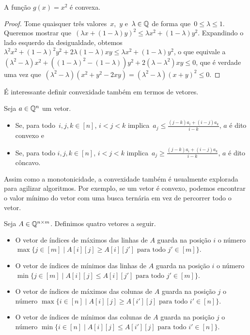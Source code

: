 \begin{prop} \label{Monge:sqConv}
A função $g(x) = x^2$ é convexa. 
\end{prop}

\begin{proof}
Tome quaisquer três valores~$x$,~$y$ e~$\lambda \in \mathbb{Q}$ de forma que~${ 0 \leq \lambda \leq 1 }$. Queremos mostrar que~${ (\lambda x + (1 - \lambda)y)^2 \leq \lambda x^2 + (1 - \lambda) y^2 }$. Expandindo o lado esquerdo da desigualdade, obtemos~${ \lambda^2x^2 + (1 - \lambda)^2y^2 + 2\lambda(1-\lambda)xy \leq \lambda x^2 + (1 - \lambda)y^2 }$, o que equivale a~${ (\lambda^2 - \lambda)x^2 + ((1-\lambda)^2 - (1 - \lambda))y^2 + 2(\lambda - \lambda^2)xy \leq 0 }$, que é verdade uma vez que~${ (\lambda^2 - \lambda)(x^2 + y^2 - 2xy) = (\lambda^2 - \lambda)(x + y)^2 \leq 0 }$.
\end{proof}

É interessante definir convexidade também em termos de vetores.

\begin{defi}
Seja $a \in \mathbb{Q}^n$ um vetor.
\begin{itemize}
    \item Se, para todo~$i,j,k \in [n]$, $i < j < k$ implica~$a_j \leq \frac{(j-k)a_i + (i-j)a_k}{i-k}$, $a$ é dito convexo e
    \item Se, para todo $i,j,k \in [n]$, $i < j < k$ implica~$a_j \geq \frac{(j-k)a_i + (i-j)a_k}{i-k}$, $a$ é dito côncavo.
\end{itemize}
\end{defi}

Assim como a monotonicidade, a convexidade também é usualmente explorada para agilizar algoritmos. Por exemplo, se um vetor é convexo, podemos encontrar o valor mínimo do vetor com uma busca ternária em vez de percorrer todo o vetor.  

\begin{defi}
Seja $A \in \mathbb{Q}^{n \times m}$. Definimos quatro vetores a seguir.
\begin{itemize}
    \item O vetor de índices de máximos das linhas de $A$ guarda na posição $i$ 
          o número $\max\{j \in [m] \mid A[i][j] \geq A[i][j'] \text{ para todo } j' \in [m]\}$. 
    \item O vetor de índices de mínimos das linhas de $A$ guarda na posição $i$ 
          o número $\min\{j \in [m] \mid A[i][j] \leq A[i][j'] \text{ para todo } j' \in [m]\}$. 
    \item O vetor de índices de máximos das colunas de $A$ guarda na posição $j$ 
          o número $\max\{i \in [n] \mid A[i][j] \geq A[i'][j] \text{ para todo } i' \in [n]\}$. 
    \item O vetor de índices de mínimos das colunas de $A$ guarda na posição $j$ 
          o número $\min\{i \in [n] \mid A[i][j] \leq A[i'][j] \text{ para todo } i' \in [n]\}$. 
\end{itemize}
\end{defi}

